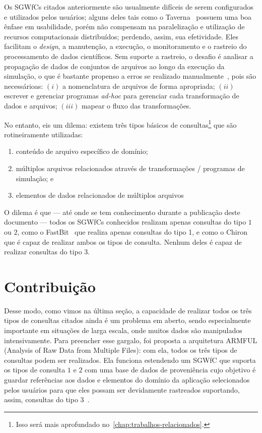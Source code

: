 Os SGWfCs citados anteriormente são usualmente difíceis de serem configurados e utilizados pelos usuários; alguns deles tais como o Taverna~\cite{hull2006taverna} possuem uma boa ênfase em usabilidade, porém não compensam na paralelização e utilização de recursos computacionais distribuídos; perdendo, assim, sua efetividade.
Eles facilitam o \textit{design}, a manutenção, a execução, o monitoramento e o rastreio do processamento de dados científicos. Sem suporte a rastreio, o desafio é analisar a propagação de dados de conjuntos de arquivos ao longo da execução da simulação, o que é bastante propenso a erros se realizado manualmente~\cite{silva2015analyzing}, pois são necessárioas: \( (i) \) a nomenclatura de arquivos de forma apropriada; \( (ii) \) escrever e gerenciar programas \textit{ad-hoc} para gerenciar cada transformação de dados e arquivos; \( (iii) \) mapear o fluxo das transformações.

No entanto, eis um dilema: existem três tipos básicos de consultas\footnote{Isso será mais aprofundado no~\autoref{chap:trabalhos-relacionados}.} que são rotineiramente utilizadas:

\begin{enumerate}
    \item conteúdo de arquivo específico de domínio;
    \item múltiplos arquivos relacionados através de transformações / programas de simulação; e
    \item elementos de dados relacionados de múltiplos arquivos
\end{enumerate}

O dilema é que --- até onde se tem conhecimento durante a publicação deste documento --- todos os SGWfCs conhecidos realizam apenas consultas do tipo \( 1 \) ou \( 2 \), como o FastBit~\cite{wu2009fastbit} que realiza apenas consultas do tipo 1, e como o Chiron~\cite{ogasawara2013chiron} que é capaz de realizar ambos os tipos de consulta. Nenhum deles é capaz de realizar consultas do tipo 3.

\section{Contribuição} %

Desse modo, como vimos na última seção, a capacidade de realizar todos os três tipos de consultas citados ainda é um problema em aberto, sendo especialmente importante em situações de larga escala, onde muitos dados são manipulados intensivamente.
Para preencher esse gargalo, foi proposta a arquitetura  ARMFUL (Analysis of Raw Data from Multiple Files)\cite{silva2017raw,silva2016situ}: com ela, todos os três tipos de consultas podem ser realizados. Ela funciona estendendo um SGWfC que suporta os tipos de consulta \( 1 \) e \( 2 \) com uma base de dados de proveniência cujo objetivo é guardar referências aos dados e elementos do domínio da aplicação selecionados pelos usuários para que eles possam ser devidamente rastreados suportando, assim, consultas do tipo 3~\cite{silva2015analyzing}.

